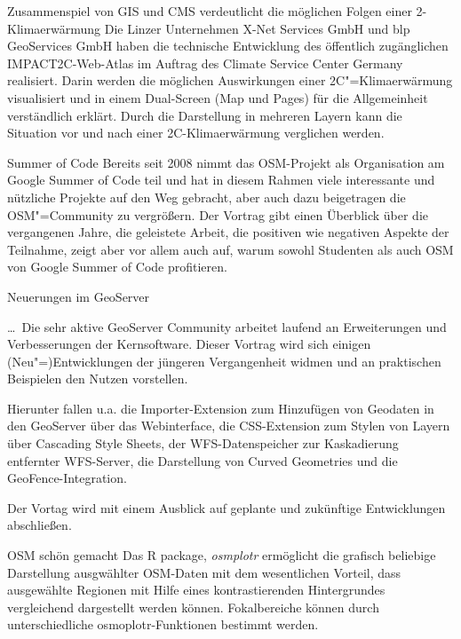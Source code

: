\renewcommand{\konferenztag}{\mittwoch}
%
{Zusammenspiel von GIS und CMS verdeutlicht die möglichen Folgen einer 2\textdegree-Klimaerwärmung}%
{}%
{Die Linzer Unternehmen X-Net Services GmbH und blp GeoServices GmbH haben die technische Entwicklung
des öffentlich zugänglichen IMPACT2C-Web-Atlas im Auftrag des Climate Service Center Germany realisiert.
Darin werden die möglichen Auswirkungen einer 2\textdegree C"=Klimaerwärmung visualisiert und in einem Dual-Screen
(Map und Pages) für die Allgemeinheit verständlich erklärt. Durch die Darstellung in mehreren Layern
kann die Situation vor und nach einer 2\textdegree C-Klimaerwärmung verglichen werden.}

\enlargethispage{4ex}
%
{Summer of Code}%
{}%
{Bereits seit 2008 nimmt das OSM-Projekt als Organisation am Google Summer of Code teil und
hat in diesem Rahmen viele interessante und nützliche Projekte auf den Weg gebracht, aber auch dazu
beigetragen die OSM"=Community zu vergrößern. Der Vortrag gibt einen Überblick über die
vergangenen Jahre, die geleistete Arbeit, die positiven wie negativen Aspekte der Teilnahme, zeigt
aber vor allem auch auf, warum sowohl Studenten als auch OSM von Google Summer of Code profitieren.}

%
{Neuerungen im GeoServer}%
{}%
{\dots\ Die sehr aktive GeoServer Community arbeitet laufend an Erweiterungen und Verbesserungen
der Kernsoftware. Dieser Vortrag wird sich einigen (Neu"=)Entwicklungen der jüngeren
Vergangenheit widmen und an praktischen Beispielen den Nutzen vorstellen.

Hierunter fallen u.a. die Importer-Extension zum Hinzufügen von Geodaten in den GeoServer über das Webinterface,
die CSS-Extension zum Stylen von Layern über Cascading Style Sheets,
der WFS-Datenspeicher zur Kaskadierung entfernter WFS-Server,
die Darstellung von Curved Geometries und
die GeoFence-Integration.

Der Vortag wird mit einem Ausblick auf geplante und zukünftige Entwicklungen abschließen.}

%
{OSM schön gemacht}%
{}%
{Das R package, \emph{osmplotr} ermöglicht  die grafisch beliebige Darstellung ausgwählter OSM-Daten mit dem
wesentlichen Vorteil, dass ausgewählte Regionen mit Hilfe eines kontrastierenden Hintergrundes vergleichend
dargestellt werden können. Fokalbereiche können durch unterschiedliche osmoplotr-Funktionen bestimmt werden.}

